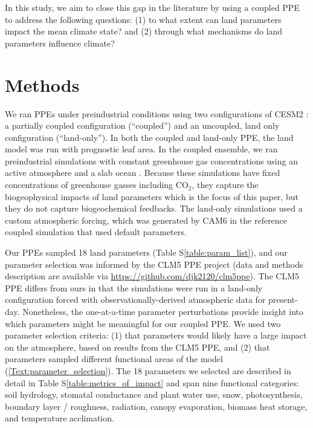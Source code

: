 \documentclass[draft]{agujournal2019}
\begin{document}
In this study, we aim to close this gap in the literature by using a coupled PPE to address the following questions: (1) to what extent can land parameters impact the mean climate state? and (2) through what mechanisms do land parameters influence climate?

\section{Methods}
We ran PPEs under preindustrial conditions using two configurations of CESM2 \citep{danabasoglu_community_2020}: a partially coupled configuration (“coupled”) and an uncoupled, land only configuration (“land-only”). In both the coupled and land-only PPE, the land model \citep[the Community Land Model version 5, CLM5;][]{lawrence_community_2019} was run with prognostic leaf area. In the coupled ensemble, we ran preindustrial simulations with constant greenhouse gas concentrations using an active atmosphere \citep[CAM6;][]{bogenschutz_path_2018} and a slab ocean \citep{danabasoglu_equilibrium_2009}. Because these simulations have fixed concentrations of greenhouse gasses including CO$_2$, they capture the biogeophysical impacts of land parameters which is the focus of this paper, but they do not capture biogeochemical feedbacks. The land-only simulations used a custom atmospheric forcing, which was generated by CAM6 in the reference coupled simulation that used default parameters.

Our PPEs sampled 18 land parameters (Table S\ref{table:param_list}), and our parameter selection was informed by the CLM5 PPE project (data and methods description are available via \url{https://github.com/djk2120/clm5ppe}). The CLM5 PPE differs from ours in that the simulations were run in a land-only configuration forced with observationally-derived atmospheric data for present-day. Nonetheless, the one-at-a-time parameter perturbations provide insight into which parameters might be meaningful for our coupled PPE. We used two parameter selection criteria: (1) that parameters would likely have a large impact on the atmosphere, based on results from the CLM5 PPE, and (2) that parameters sampled different functional areas of the model (\ref{Text:parameter_selection}). The 18 parameters we selected are described in detail in Table S\ref{table:metrics_of_impact} and span nine functional categories: soil hydrology, stomatal conductance and plant water use, snow, photosynthesis, boundary layer / roughness, radiation, canopy evaporation, biomass heat storage, and temperature acclimation.
\end{document}
